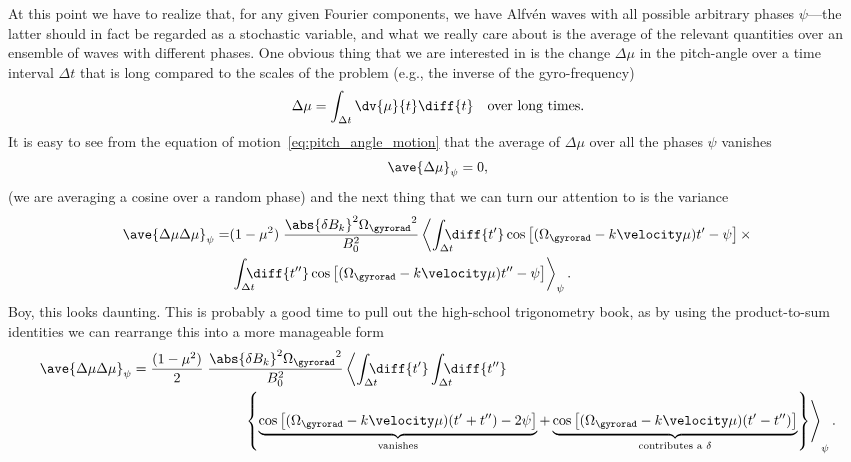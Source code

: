 At this point we have to realize that, for any given Fourier components, we have
Alfv\'en waves with all possible arbitrary phases $\psi$---the latter should in fact
be regarded as a stochastic variable, and what we really care about is the
average of the relevant quantities over an ensemble of waves with different phases.
One obvious thing that we are interested in is the change $\Delta \mu$ in the
pitch-angle over a time interval $\Delta t$ that is long compared to the scales of the
problem (e.g., the inverse of the gyro-frequency)
\begin{align*}
  \Delta \mu = \int_{\Delta t} \dv{\mu}{t} \diff{t} \quad\text{over long times}.
\end{align*}
It is easy to see from the equation of motion~\eqref{eq:pitch_angle_motion} that the
average of $\Delta \mu$ over all the phases $\psi$ vanishes
\begin{align}\label{eq:pitch_angle_mean}
  \ave{\Delta \mu}_\psi = 0,
\end{align}
(we are averaging a cosine over a random phase) and the next thing that we can turn
our attention to is the variance
\begin{align*}
  \ave{\Delta \mu \Delta \mu}_\psi = &
  (1 - \mu^2) \; \frac{\abs{\delta B_k}^2 {\Omega_\gyrorad}^2}{B_0^2}
  \left<
    \int_{\Delta t} \!\!\!\!\!
    \diff{t'} \cos \left[ (\Omega_\gyrorad - k\velocity\mu) t' - \psi \right]
    \times\right. \\
    & \left. \int_{\Delta t} \!\!\!\!\!
    \diff{t''} \cos \left[ (\Omega_\gyrorad - k\velocity\mu) t'' - \psi \right]
  \right>_\psi.
\end{align*}
Boy, this looks daunting. This is probably a good time to pull out the high-school
trigonometry book, as by using the product-to-sum identities
we can rearrange this into a more manageable form
\begin{align*}
  \ave{\Delta \mu \Delta \mu}_\psi =
  \frac{(1 - \mu^2)}{2} \; \frac{\abs{\delta B_k}^2 {\Omega_\gyrorad}^2}{B_0^2}
  \left<
  \int_{\Delta t} \!\!\!\!\!
  \diff{t'} \int_{\Delta t} \!\!\!\!\!
  \diff{t''}   \right. & \\
  & \hspace*{-190pt} \left. \left\{
    \underbrace{\cos \left[ (\Omega_\gyrorad - k\velocity\mu) (t' + t'') - 2\psi \right]}_{\text{vanishes}} +
    \underbrace{\cos \left[ (\Omega_\gyrorad - k\velocity\mu) (t' - t'') \right]}_{\text{contributes a }\delta}
  \right\} \right>_\psi.
\end{align*}
